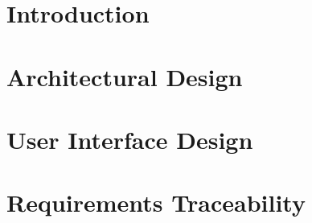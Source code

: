 \documentclass{Configuration_Files/PoliMi3i_project}
\begin{document}
\tableofcontents %
\thispagestyle{empty}


%
%
%    
%

\mainmatter %

\clearpage
{{\chapter{Introduction}}}
\label{sect:introduction}


\clearpage
{{\chapter{Architectural Design}}}
\label{sect:ad}


\clearpage
{{\chapter{User Interface Design}}}
\label{sect:ui}

\clearpage
{{\chapter{Requirements Traceability}}}
\label{sect:requirements}

\end{document}
